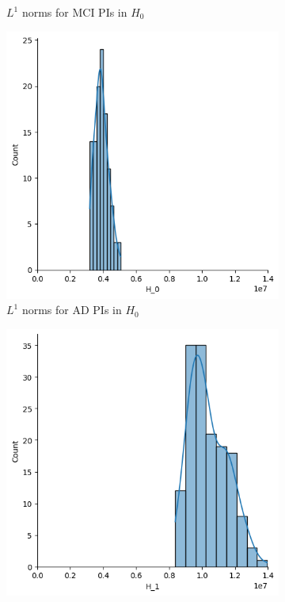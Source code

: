 \documentclass{article}
\begin{document}
\begin{figure}[htb]
\begin{subfigure}{0.32\textwidth}
    \caption{$L^1$ norms for MCI PIs in $H_0$}
  \end{subfigure}
  \begin{subfigure}{0.32\textwidth}
    \includegraphics[width=\textwidth]{figures/median_pis/median_pi_AD_H_0_displot.png}
    \caption{$L^1$ norms for AD PIs in $H_0$}
  \end{subfigure}
  \begin{subfigure}{0.32\textwidth}
    \includegraphics[width=\textwidth]{figures/median_pis/median_pi_CN_H_1_displot.png}

\end{subfigure}
\end{figure}
\end{document}
